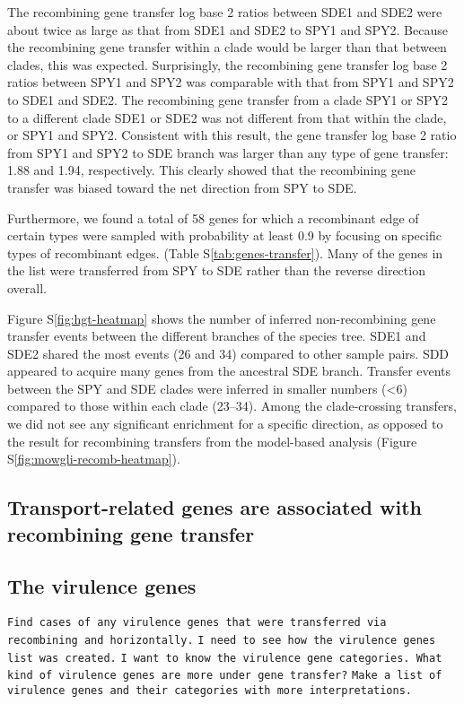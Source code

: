 \documentclass[english]{article}
\begin{document}
The recombining gene transfer log base 2 ratios between SDE1 and SDE2 were about
twice as large as that from SDE1 and SDE2 to SPY1 and SPY2. Because the
recombining gene transfer within a clade would be larger than that between
clades, this was expected. Surprisingly, the recombining gene transfer log base
2 ratios between SPY1 and SPY2 was comparable with that from SPY1 and SPY2 to
SDE1 and SDE2.  The recombining gene transfer from a clade SPY1 or SPY2 to a
different clade SDE1 or SDE2 was not different from that within the clade, or
SPY1 and SPY2.  Consistent with this result, the gene transfer log base 2 ratio
from SPY1 and SPY2 to SDE branch was larger than any type of gene transfer: 1.88
and 1.94, respectively. This clearly showed that the recombining gene transfer
was biased toward the net direction from SPY to SDE.

Furthermore, we found a total of 58 genes 
for which a recombinant edge 
of certain types were sampled with probability at least 0.9
by focusing on specific types of recombinant edges.
(Table S\ref{tab:genes-transfer}).  Many of the genes in the list were
transferred from SPY to SDE rather than the reverse direction overall.


Figure S\ref{fig:hgt-heatmap} shows the number of inferred
non-recombining gene transfer events between the different branches of
the species tree.
SDE1 and SDE2 shared the most events (26 and 34) compared to other sample pairs. 
SDD appeared to acquire many genes from the ancestral SDE branch. Transfer 
events between the SPY and SDE clades were inferred in smaller numbers (<6) 
compared to those within each clade (23--34). Among the clade-crossing 
transfers, we did not see any significant enrichment for a specific direction, 
as opposed to the result for recombining transfers from the model-based 
analysis (Figure S\ref{fig:mowgli-recomb-heatmap}).

\subsection{Transport-related genes are associated with recombining gene
transfer}

\subsection{The virulence genes}
\texttt{Find cases of any virulence genes that were transferred via recombining and
horizontally.} 
\texttt{I need to see how the virulence genes list was created.}
\texttt{I want to know the virulence gene categories. What kind of virulence
genes are more under gene transfer?}
\texttt{Make a list of virulence genes and their categories with more
interpretations.}
\end{document}
